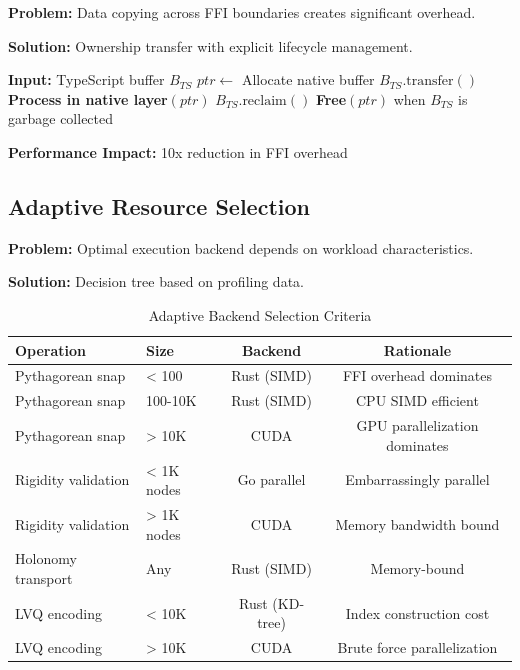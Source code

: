 \documentclass{article}
\begin{document}
\textbf{Problem:} Data copying across FFI boundaries creates significant overhead.

\textbf{Solution:} Ownership transfer with explicit lifecycle management.

\begin{algorithm}[H]
\caption{Zero-Copy Buffer Transfer}
\begin{algorithmic}[1]
\State \textbf{Input:} TypeScript buffer $B_{TS}$
\State $ptr \leftarrow$ Allocate native buffer
\State $B_{TS}.\text{transfer}()$ 
\State \textbf{Process in native layer}$(ptr)$
\State $B_{TS}.\text{reclaim}()$ 
\State \textbf{Free}$(ptr)$ when $B_{TS}$ is garbage collected
\end{algorithmic}
\end{algorithm}

\textbf{Performance Impact:} 10x reduction in FFI overhead

\subsection{Adaptive Resource Selection}

\textbf{Problem:} Optimal execution backend depends on workload characteristics.

\textbf{Solution:} Decision tree based on profiling data.

\begin{table}[h]
\centering
\begin{tabular}{llcc}
\toprule
Operation & Size & Backend & Rationale \\
\midrule
Pythagorean snap & < 100 & Rust (SIMD) & FFI overhead dominates \\
Pythagorean snap & 100-10K & Rust (SIMD) & CPU SIMD efficient \\
Pythagorean snap & > 10K & CUDA & GPU parallelization dominates \\
Rigidity validation & < 1K nodes & Go parallel & Embarrassingly parallel \\
Rigidity validation & > 1K nodes & CUDA & Memory bandwidth bound \\
Holonomy transport & Any & Rust (SIMD) & Memory-bound \\
LVQ encoding & < 10K & Rust (KD-tree) & Index construction cost \\
LVQ encoding & > 10K & CUDA & Brute force parallelization \\
\bottomrule
\end{tabular}
\caption{Adaptive Backend Selection Criteria}
\end{table}
\end{document}
